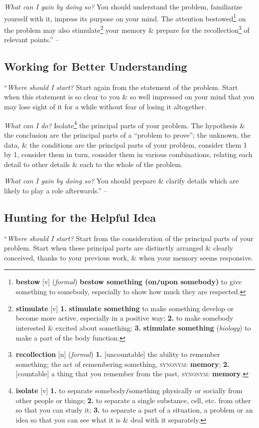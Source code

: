 \documentclass[oneside]{book}
\numberwithin{equation}{section}
\begin{document}
\textit{What can I gain by doing so?} You should understand the problem, familiarize yourself with it, impress its purpose on your mind. The attention bestowed\footnote{\textbf{bestow} [v] (\textit{formal}) \textbf{bestow something (on\texttt{/}upon somebody)} to give something to somebody, especially to show how much they are respected.} on the problem may also stimulate\footnote{\textbf{stimulate} [v] \textbf{1.} \textbf{stimulate something} to make something develop or become more active, especially in a positive way; \textbf{2.} to make somebody interested \& excited about something; \textbf{3.} \textbf{stimulate something} (\textit{biology}) to make a part of the body function.} your memory \& prepare for the recollection\footnote{\textbf{recollection} [n] (\textit{formal}) \textbf{1.} [uncountable] the ability to remember something; the act of remembering something, \textsc{synonym}: \textbf{memory}; \textbf{2.} [countable] a thing that you remember from the past, \textsc{synonym}: \textbf{memory}.} of relevant points.'' -- \cite[p. 33]{Polya2014}

\subsection{Working for Better Understanding}
``\textit{Where should I start?} Start again from the statement of the problem. Start when this statement is so clear to you \& so well impressed on your mind that you may lose sight of it for a while without fear of losing it altogether.

\textit{What can I do?} Isolate\footnote{\textbf{isolate} [v] \textbf{1.} to separate somebody\texttt{/}something physically or socially from other people or things; \textbf{2.} to separate a single substance, cell, etc. from other so that you can study it; \textbf{3.} to separate a part of a situation, a problem or an idea so that you can see what it is \& deal with it separately.} the principal parts of your problem. The hypothesis \& the conclusion are the principal parts of a ``problem to prove''; the unknown, the data, \& the conditions are the principal parts of your problem, consider them 1 by 1, consider them in turn, consider them in various combinations, relating each detail to other details \& each to the whole of the problem.

\textit{What can I gain by doing so?} You should prepare \& clarify details which are likely to play a role afterwards.'' -- \cite[p. 33]{Polya2014}

\subsection{Hunting for the Helpful Idea}
``\textit{Where should I start?} Start from the consideration of the principal parts of your problem. Start when these principal parts are distinctly arranged \& clearly conceived, thanks to your previous work, \& when your memory seems responsive.
\end{document}
